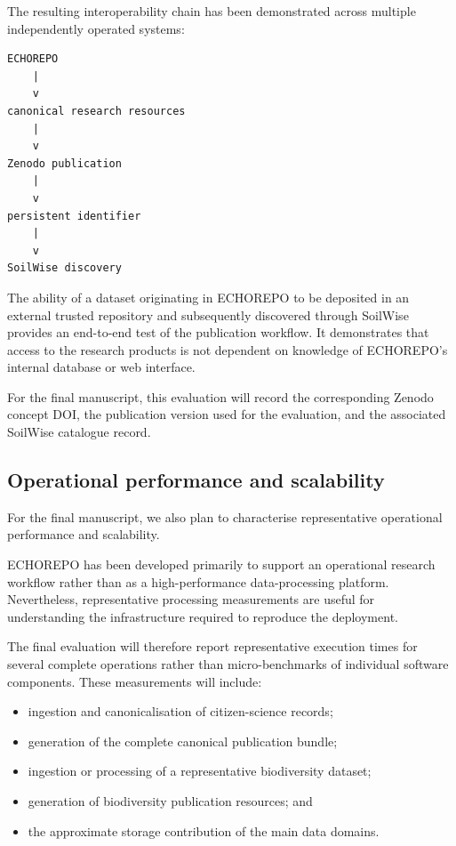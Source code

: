The resulting interoperability chain has been demonstrated across
multiple independently operated systems:

\begin{verbatim}
ECHOREPO
    |
    v
canonical research resources
    |
    v
Zenodo publication
    |
    v
persistent identifier
    |
    v
SoilWise discovery
\end{verbatim}

The ability of a dataset originating in ECHOREPO to be deposited in an
external trusted repository and subsequently discovered through SoilWise
provides an end-to-end test of the publication workflow. It demonstrates
that access to the research products is not dependent on knowledge of
ECHOREPO's internal database or web interface.

For the final manuscript, this evaluation will record the corresponding
Zenodo concept DOI, the publication version used for the evaluation, and
the associated SoilWise catalogue record.

\subsection{Operational performance and scalability}

For the final manuscript, we also plan to characterise representative
operational performance and scalability.

ECHOREPO has been developed primarily to support an operational research
workflow rather than as a high-performance data-processing platform.
Nevertheless, representative processing measurements are useful for
understanding the infrastructure required to reproduce the deployment.

The final evaluation will therefore report representative execution times
for several complete operations rather than micro-benchmarks of individual
software components. These measurements will include:

\begin{itemize}
    \item ingestion and canonicalisation of citizen-science records;
    \item generation of the complete canonical publication bundle;
    \item ingestion or processing of a representative biodiversity dataset;
    \item generation of biodiversity publication resources; and
    \item the approximate storage contribution of the main data domains.
\end{itemize}

